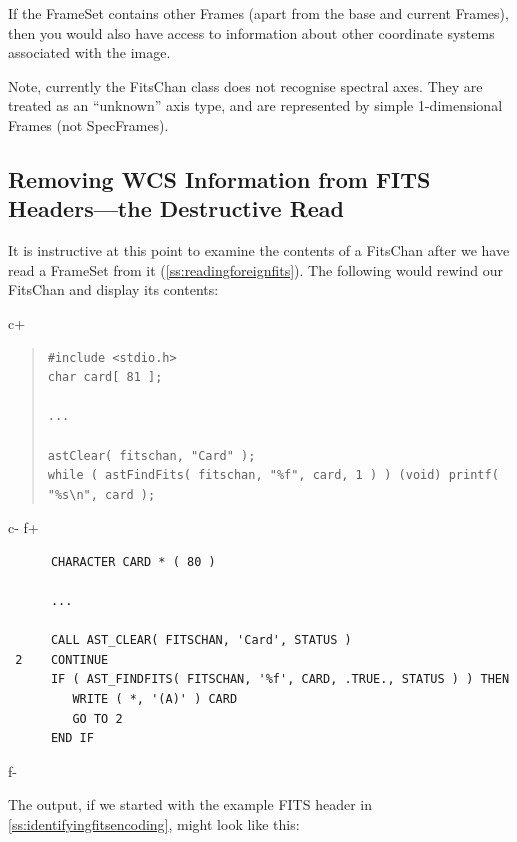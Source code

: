 \documentclass[twoside,11pt]{article}
\newcommand{\secref}[1]{\S\ref{#1}}
\renewcommand{\secref}[1]{\ref{#1}}
\begin{document}
If the FrameSet contains other Frames (apart from the base and current
Frames), then you would also have access to information about other
coordinate systems associated with the image.

Note, currently the FitsChan class does not recognise spectral axes. They
are treated as an ``unknown'' axis type, and are represented by simple
1-dimensional Frames (not SpecFrames).

\subsection{\label{ss:destructiveread}Removing WCS Information from FITS Headers---the Destructive Read}

It is instructive at this point to examine the contents of a FitsChan
after we have read a FrameSet from it
(\secref{ss:readingforeignfits}). The following would rewind our
FitsChan and display its contents:

c+
\begin{quote}
\small
\begin{verbatim}
#include <stdio.h>
char card[ 81 ];

...

astClear( fitschan, "Card" );
while ( astFindFits( fitschan, "%f", card, 1 ) ) (void) printf( "%s\n", card );
\end{verbatim}
\normalsize
\end{quote}
c-
f+
\small
\begin{verbatim}
      CHARACTER CARD * ( 80 )

      ...

      CALL AST_CLEAR( FITSCHAN, 'Card', STATUS )
 2    CONTINUE
      IF ( AST_FINDFITS( FITSCHAN, '%f', CARD, .TRUE., STATUS ) ) THEN
         WRITE ( *, '(A)' ) CARD
         GO TO 2
      END IF
\end{verbatim}
\normalsize
f-

The output, if we started with the example FITS header in
\secref{ss:identifyingfitsencoding}, might look like this:
\end{document}
